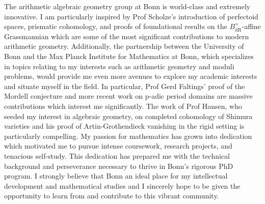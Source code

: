 \documentclass[11pt]{article}
\begin{document}
\par
The arithmetic algebraic geometry group at Bonn is world-class and extremely innovative. I am particularly inspired by Prof Scholze’s introduction of perfectoid spaces, prismatic cohomology, and proofs of foundational results on the $B_{\mathrm{dR}}^+$-affine Grassmannian which are some of the most significant contributions to modern arithmetic geometry. Additionally, the partnership between the University of Bonn and the Max Planck Institute for Mathematics at Bonn, which specializes in topics relating to my interests such as arithmetic geometry and moduli problems, would provide me even more avenues to explore my academic interests and situate myself in the field. In particular, Prof Gerd Faltings’ proof of the Mordell conjecture and more recent work on p-adic period domains are massive contributions which interest me significantly. The work of Prof Hansen, who seeded my interest in algebraic geometry, on completed cohomology of Shimura varieties and his proof of Artin-Grothendieck vanishing in the rigid setting is particularly compelling. My passion for mathematics has grown into dedication which motivated me to pursue intense coursework, research projects, and tenacious self-study. This dedication has prepared me with the technical background and perseverance necessary to thrive in Bonn’s rigorous PhD program. I strongly believe that Bonn an ideal place for my intellectual development and mathematical studies and I sincerely hope to be given the opportunity to learn from and contribute to this vibrant community.  
\end{document}

